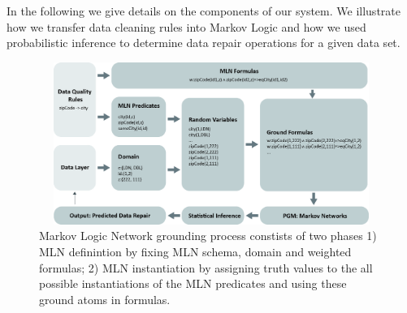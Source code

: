 In the following we give details on the components of our system. We illustrate how we transfer data cleaning rules into Markov Logic
and how we used probabilistic inference to determine data repair operations for a given data set. 




\begin{figure}[t]
 \centering
 \includegraphics[width=450px, height=200px]{img/mlogic-grounging.jpg}
 \caption{Markov Logic Network grounding process constists of two phases 1) MLN definintion by fixing MLN schema, domain and weighted formulas; 2) MLN instantiation by assigning truth values to the all possible instantiations of the MLN predicates and using these ground atoms in formulas.}
 \label{fig:mlngrounding}
\end{figure}

